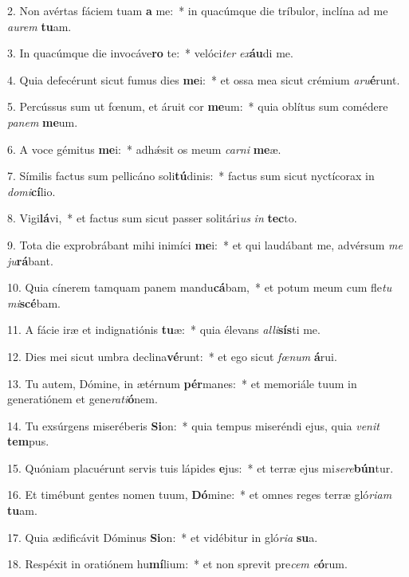 2. Non avértas fáciem tuam \textbf{a} me:~*  in quacúmque die tríbulor, inclína ad me \textit{au}\textit{rem} \textbf{tu}am.\

3. In quacúmque die invocáve\textbf{ro} te:~*  velóci\textit{ter} \textit{ex}\textbf{áu}di me.\

4. Quia defecérunt sicut fumus dies \textbf{me}i:~*  et ossa mea sicut crémium \textit{a}\textit{ru}\textbf{é}runt.\

5. Percússus sum ut fœnum, et áruit cor \textbf{me}um:~*  quia oblítus sum comédere \textit{pa}\textit{nem} \textbf{me}um.\

6. A voce gémitus \textbf{me}i:~*  adhǽsit os meum \textit{car}\textit{ni} \textbf{me}æ.\

7. Símilis factus sum pellicáno soli\textbf{tú}dinis:~*  factus sum sicut nyctícorax in \textit{do}\textit{mi}\textbf{cí}lio.\

8. Vigi\textbf{lá}vi,~*  et factus sum sicut passer solitári\textit{us} \textit{in} \textbf{tec}to.\

9. Tota die exprobrábant mihi inimíci \textbf{me}i:~*  et qui laudábant me, advérsum \textit{me} \textit{ju}\textbf{rá}bant.\

10. Quia cínerem tamquam panem mandu\textbf{cá}bam,~*  et potum meum cum fle\textit{tu} \textit{mi}\textbf{scé}bam.\

11. A fácie iræ et indignatiónis \textbf{tu}æ:~*  quia élevans \textit{al}\textit{li}\textbf{sís}ti me.\

12. Dies mei sicut umbra declina\textbf{vé}runt:~*  et ego sicut \textit{fœ}\textit{num} \textbf{á}rui.\

13. Tu autem, Dómine, in ætérnum \textbf{pér}manes:~*  et memoriále tuum in generatiónem et gene\textit{ra}\textit{ti}\textbf{ó}nem.\

14. Tu exsúrgens miseréberis \textbf{Si}on:~*  quia tempus miseréndi ejus, quia \textit{ve}\textit{nit} \textbf{tem}pus.\

15. Quóniam placuérunt servis tuis lápides \textbf{e}jus:~*  et terræ ejus mi\textit{se}\textit{re}\textbf{bún}tur.\

16. Et timébunt gentes nomen tuum, \textbf{Dó}mine:~*  et omnes reges terræ gló\textit{ri}\textit{am} \textbf{tu}am.\

17. Quia ædificávit Dóminus \textbf{Si}on:~*  et vidébitur in gló\textit{ri}\textit{a} \textbf{su}a.\

18. Respéxit in oratiónem hu\textbf{mí}lium:~*  et non sprevit pre\textit{cem} \textit{e}\textbf{ó}rum.\


